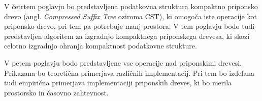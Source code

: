 
V četrtem poglavju bo predstavljena podatkovna struktura kompaktno priponsko drevo (angl. \textit{Compressed Suffix Tree} oziroma CST), ki omogoča iste operacije kot priponsko drevo, pri tem pa potrebuje manj prostora. V tem poglavju bodo tudi predstavljen algoritem za izgradnjo kompaktnega priponskega drevesa, ki skozi celotno izgradnjo ohranja kompaktnost podatkovne strukture.

V petem poglavju bodo predstavljene vse operacije nad priponskimi drevesi. Prikazana bo teoretična primerjava različnih implementacij. Pri tem bo izdelana tudi empirična primerjava implementaciji priponskih dreves, ki bo merila prostorsko in časovno zahtevnost.